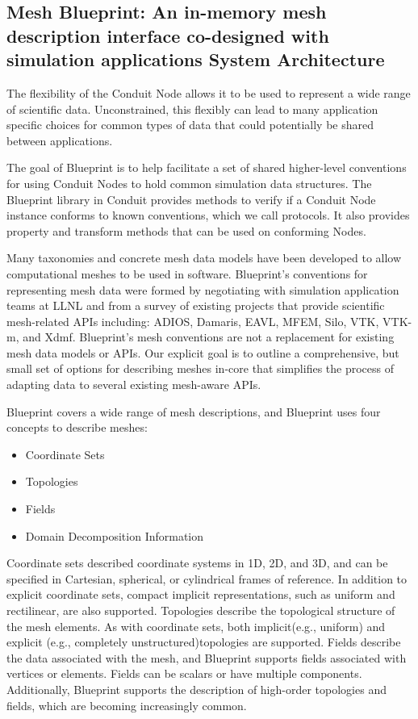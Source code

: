 \subsection{Mesh Blueprint: An in-memory mesh description interface co-designed with simulation applications
System Architecture}

The flexibility of the Conduit Node allows it to be used to represent a
wide range of scientific data.
%
Unconstrained, this flexibly can lead to
many application specific choices for common types of data that could
potentially be shared between applications.

The goal of Blueprint is to help facilitate a set of shared higher-level
conventions for using Conduit Nodes to hold common simulation data structures.
%
The Blueprint library in Conduit provides methods to verify if a Conduit
Node instance conforms to known conventions, which we call protocols.
%
It also provides property and transform methods that can be used on conforming Nodes.

Many taxonomies and concrete mesh data models have been developed to allow
computational meshes to be used in software.
%
Blueprint’s conventions for representing mesh data were formed by negotiating
with simulation application teams at LLNL and from a survey of existing
projects that provide scientific mesh-related APIs including: ADIOS, Damaris,
EAVL, MFEM, Silo, VTK, VTK-m, and Xdmf.
%
Blueprint’s mesh conventions are not a replacement for existing mesh data
models or APIs.
%
Our explicit goal is to outline a comprehensive, but small set of options
for describing meshes in-core that simplifies the process of adapting data
to several existing mesh-aware APIs.

Blueprint covers a wide range of mesh descriptions, and
Blueprint uses four concepts to describe meshes:

\begin{itemize}
  \item Coordinate Sets
  \item Topologies
  \item Fields
  \item Domain Decomposition Information
\end{itemize}

Coordinate sets described coordinate systems in 1D, 2D, and 3D, and
can be specified in Cartesian, spherical, or cylindrical frames of reference.
%
In addition to explicit coordinate sets, compact implicit representations,
such as uniform and rectilinear, are also supported.
%
Topologies describe the topological structure of the mesh elements.
%
As with coordinate sets, both implicit(e.g., uniform) and explicit
(e.g., completely unstructured)topologies are supported.
%
Fields describe the data associated with the mesh, and Blueprint supports
fields associated with vertices or elements.
%
Fields can be scalars or have multiple components.
%
Additionally, Blueprint supports the description of high-order
topologies and fields, which are becoming increasingly common.

